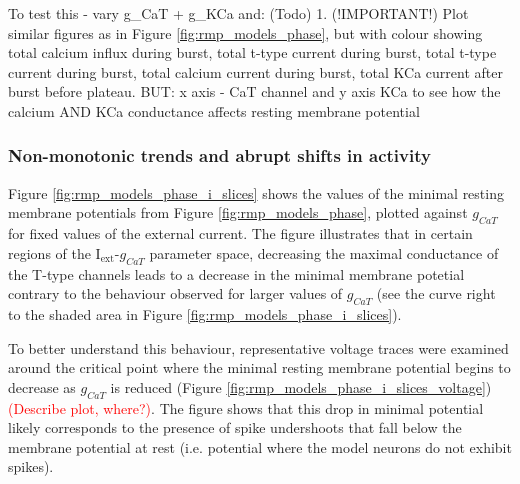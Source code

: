 \documentclass[../main.tex]{subfiles}
\begin{document}
\color{red}

To test this - vary g\_CaT + g\_KCa and: (Todo) 1. (!IMPORTANT!) Plot similar figures as in Figure \ref{fig:rmp_models_phase}, but with colour showing total calcium influx during burst, total t-type current during burst, total t-type current during burst, total calcium current during burst, total KCa current after burst before plateau.
BUT: x axis - CaT channel and y axis KCa to see how the calcium AND KCa conductance affects resting membrane potential

\color{black}


\subsubsection{Non-monotonic trends and abrupt shifts in activity}

Figure \ref{fig:rmp_models_phase_i_slices} shows the values of the minimal resting membrane potentials from Figure \ref{fig:rmp_models_phase}, plotted against $g_{CaT}$ for fixed values of the external current. The figure illustrates that in certain regions of the I$_{\text{ext}}$-$g_{CaT}$ parameter space, decreasing the maximal conductance of the T-type channels leads to a decrease in the minimal membrane potetial contrary to the behaviour observed for larger values of $g_{CaT}$ (see the curve right to the shaded area in Figure \ref{fig:rmp_models_phase_i_slices}).

To better understand this behaviour, representative voltage traces were examined around the critical point where the minimal resting membrane potential begins to decrease as $g_{CaT}$ is reduced (Figure \ref{fig:rmp_models_phase_i_slices_voltage}) \textcolor{red}{(Describe plot, where?)}. The figure shows that this drop in minimal potential likely corresponds to the presence of spike undershoots that fall below the membrane potential at rest (i.e. potential where the model neurons do not exhibit spikes).

\end{document}
